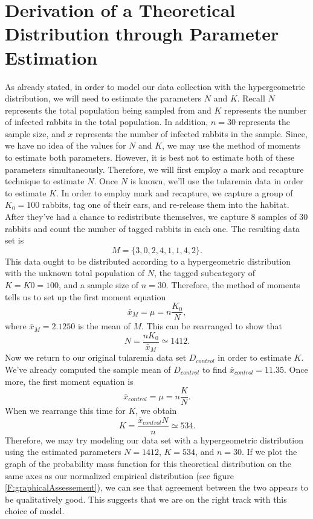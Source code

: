 \documentclass{amsart}
\begin{document}
\section{Derivation of a Theoretical Distribution through Parameter Estimation}
As already stated, in order to model our data collection with the hypergeometric distribution, we will need to estimate the parameters $N$ and $K$. Recall $N$ represents the total population being sampled from and $K$ represents the number of infected rabbits in the total population.  In addition, $n=30$ represents the sample size, and $x$ represents the number of infected rabbits in the sample. Since, we have no idea of the values for $N$ and $K$, we may use the method of moments to estimate both parameters.  However, it is best not to estimate both of these parameters simultaneously.  Therefore, we will first employ a mark and recapture technique to estimate $N$.  Once $N$ is known, we’ll use the tularemia data in order to estimate $K$.
In order to employ mark and recapture, we capture a group of $K_0=100$ rabbits, tag one of their ears, and re-release them into the habitat.  After they’ve had a chance to redistribute themselves, we capture 8 samples of 30 rabbits and count the number of tagged rabbits in each one.  The resulting data set is 
\[
M=\{3, 0, 2, 4, 1, 1, 4, 2\}.
\]
This data ought to be distributed according to a hypergeometric distribution with the unknown total population of $N$, the tagged subcategory of $K=K0=100$, and a sample size of $n=30$.  Therefore, the method of moments tells us to set up the first moment equation 
\[
\bar{x}_M=\mu=n\frac{K_0}{N},
\]
where $\bar{x}_M=2.1250$ is the mean of $M$. This can be rearranged to show that 
\[
N=\frac{n K_0}{\bar{x}_M}\simeq 1412.
\]
Now we return to our original tularemia data set $D_{control}$ in order to estimate $K$. We’ve already computed the sample mean of $D_{control}$ to find $\bar{x}_{control}=11.35$.  Once more, the first moment equation is
\[
\bar{x}_{control}=\mu=n\frac{K}{N}.
\]
When we rearrange this time for $K$, we obtain
\[
K=\frac{\bar{x}_{control} N}{n}\simeq 534.
\]
Therefore, we may try modeling our data set with a hypergeometric distribution using the estimated parameters $N=1412$, $K=534$, and $n=30$.  If we plot the graph of the probability mass function for this theoretical distribution on the same axes as our normalized empirical distribution (see figure \ref{F:graphicalAssessement}), we can see that agreement between the two appears to be qualitatively good.  This suggests that we are on the right track with this choice of model.
\end{document}
